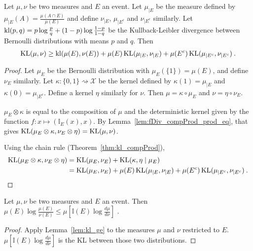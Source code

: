 \begin{lemma}
  \label{lem:kl_chain_rule_cond_event}
  Let $\mu, \nu$ be two measures and $E$ an event. Let $\mu_{|E}$ be the measure defined by $\mu_{|E}(A) = \frac{\mu(A \cap E)}{\mu(E)}$ and define $\nu_{|E}$, $\mu_{| E^c}$ and $\nu_{| E^c}$ similarly. Let $\operatorname{kl}(p,q) = p\log\frac{p}{q} + (1-p)\log\frac{1-p}{1-q}$ be the Kullback-Leibler divergence between Bernoulli distributions with means $p$ and $q$. Then
  \begin{align*}
  \operatorname{KL}(\mu, \nu) \ge \operatorname{kl}(\mu(E), \nu(E)) + \mu(E) \operatorname{KL}(\mu_{|E}, \nu_{|E}) + \mu(E^c) \operatorname{KL}(\mu_{|E^c}, \nu_{|E^c}) \: .
  \end{align*}
\end{lemma}

\begin{proof}
Let $\mu_E$ be the Bernoulli distribution with $\mu_E(\{1\}) = \mu(E)$, and define $\nu_E$ similarly.
Let $\kappa : \{0,1\} \rightsquigarrow \mathcal X$ be the kernel defined by $\kappa(1) = \mu_{|E}$ and $\kappa(0) = \mu_{|E^c}$. Define a kernel $\eta$ similarly for $\nu$.
Then $\mu = \kappa \circ \mu_E$ and $\nu = \eta \circ \nu_E$.

$\mu_E \otimes \kappa$ is equal to the composition of $\mu$ and the deterministic kernel given by the function $f : x \mapsto (\mathbb{I}_E(x), x)$. By Lemma~\ref{lem:fDiv_compProd_prod_eq}, that gives $\operatorname{KL}(\mu_E \otimes \kappa, \nu_E \otimes \eta) = \operatorname{KL}(\mu, \nu)$.

Using the chain rule (Theorem~\ref{thm:kl_compProd}),
\begin{align*}
\operatorname{KL}(\mu_E \otimes \kappa, \nu_E \otimes \eta)
&= \operatorname{KL}(\mu_E, \nu_E) + \operatorname{KL}(\kappa, \eta \mid \mu_E)
\\
&= \operatorname{KL}(\mu_E, \nu_E) + \mu(E) \operatorname{KL}(\mu_{|E}, \nu_{|E}) + \mu(E^c) \operatorname{KL}(\mu_{|E^c}, \nu_{|E^c})
\: .
\end{align*}

\end{proof}

\begin{lemma}
  \label{lem:expectation_llr_event}
  Let $\mu, \nu$ be two measures and $E$ an event. Then
  $\mu(E)\log\frac{\mu(E)}{\nu(E)} \le \mu\left[\mathbb{I}(E)\log \frac{d \mu}{d \nu}\right]$ .
\end{lemma}

\begin{proof}
Apply Lemma~\ref{lem:kl_ge} to the measures $\mu$ and $\nu$ restricted to $E$. $\mu\left[\mathbb{I}(E)\log \frac{d \mu}{d \nu}\right]$ is the KL between those two distributions.
\end{proof}
